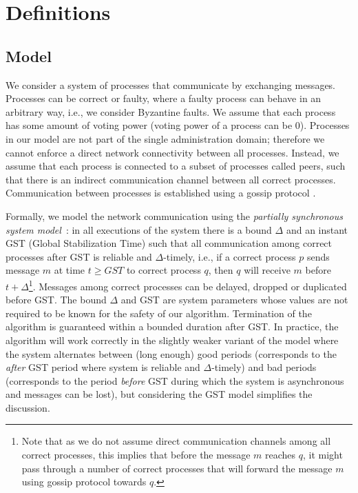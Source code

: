 \section{Definitions}
\label{sec:definitions}

\subsection{Model}

We consider a system of processes that communicate by exchanging messages.
Processes can be correct or faulty, where a faulty process can behave in an arbitrary way,
 i.e., we consider Byzantine faults. We assume that each process has some amount of voting power (voting power of a process can be $0$).
Processes in our model are not part of the single administration domain; therefore we cannot enforce a direct network connectivity between all processes. Instead, we assume that each process is connected to a subset of processes called peers, 
such that there is an indirect communication channel between all correct processes. Communication between processes is established using a gossip protocol \cite{Dem1987:gossip}.

Formally, we model the network communication using the \emph{partially synchronous system model}~\cite{DLS88:jacm}: in all executions
of the system there is a bound $\Delta$ and an instant GST (Global Stabilization Time) such that all communication among correct processes 
after GST is reliable and $\Delta$-timely, i.e., if a correct process $p$ sends message $m$ at time $t \ge GST$ to correct process $q$, then $q$ will receive $m$ before $t + \Delta$\footnote{Note that as we do not assume direct communication channels among all correct processes, this implies that before the message $m$ reaches $q$, it might pass through a number of 
	correct processes that will forward the message $m$ using gossip protocol towards $q$.}. Messages among correct processes can be delayed, dropped or duplicated before GST. 
The bound $\Delta$ and GST are system parameters whose values are not required to be known for the safety of our algorithm. Termination of the algorithm is guaranteed within a bounded duration after GST.
In practice, the algorithm will work correctly in the slightly weaker variant of the model where the system alternates between (long enough) good periods (corresponds to the \emph{after} GST period where system is reliable and $\Delta$-timely) and bad periods (corresponds to the period \emph{before} GST during which the system is asynchronous and messages can be lost), but considering the GST model simplifies the discussion.  

